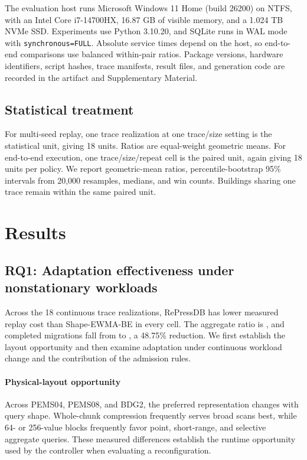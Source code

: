 \documentclass[final,5p,times,twocolumn,authoryear]{elsarticle}
\begin{document}
The evaluation host runs Microsoft Windows 11 Home (build 26200) on NTFS, with an Intel Core i7-14700HX, 16.87 GB of visible memory, and a 1.024 TB NVMe SSD. Experiments use Python 3.10.20, and SQLite runs in WAL mode with \texttt{synchronous=FULL}. Absolute service times depend on the host, so end-to-end comparisons use balanced within-pair ratios. Package versions, hardware identifiers, script hashes, trace manifests, result files, and generation code are recorded in the artifact and Supplementary Material.

\subsection{Statistical treatment}

For multi-seed replay, one trace realization at one trace/size setting is the statistical unit, giving 18 units. Ratios are equal-weight geometric means. For end-to-end execution, one trace/size/repeat cell is the paired unit, again giving 18 units per policy. We report geometric-mean ratios, percentile-bootstrap 95\% intervals from 20,000 resamples, medians, and win counts. Buildings sharing one trace remain within the same paired unit.

\section{Results}
\label{sec:results}

\subsection{RQ1: Adaptation effectiveness under nonstationary workloads}

Across the 18 continuous trace realizations, RePressDB has lower measured replay cost than Shape-EWMA-BE in every cell. The aggregate ratio is \ReplayRepressShapeRatio, and completed migrations fall from \ReplayShapeMigrations{} to \ReplayRepressMigrations, a 48.75\% reduction. We first establish the layout opportunity and then examine adaptation under continuous workload change and the contribution of the admission rules.

\paragraph{Physical-layout opportunity}
Across PEMS04, PEMS08, and BDG2, the preferred representation changes with query shape. Whole-chunk compression frequently serves broad scans best, while 64- or 256-value blocks frequently favor point, short-range, and selective aggregate queries. These measured differences establish the runtime opportunity used by the controller when evaluating a reconfiguration.
\end{document}

